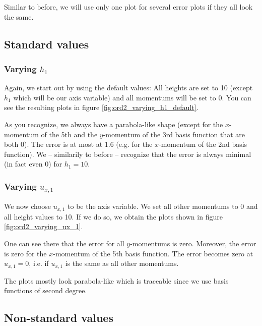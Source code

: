 \documentclass{article}
\begin{document}
Similar to before, we will use only one plot for several error plots if they all look the same.

\subsection{Standard values}
\label{sec:stiffness-analyiss-ord2-default}

\subsubsection{Varying $h_1$}
\label{sec:stiffness-analysis-ord2-default-var-h1}

Again, we start out by using the default values: All heights are set to 10 (except $h_1$ which will be our axis variable) and all momentums will be set to 0. You can see the resulting plots in figure \ref{fig:ord2_varying_h1_default}. 



As you recognize, we always have a parabola-like shape (except for the $x$-momentum of the 5th and the $y$-momentum of the 3rd basis function that are both 0). The error is at most at 1.6 (e.g. for the $x$-momentum of the 2nd basis function). We -- similarily to before -- recognize that the error is always minimal (in fact even 0) for $h_1=10$.

\subsubsection{Varying $u_{x,1}$}
\label{sec:stiffness-analysis-ord2-default-var-ux1}

We now choose $u_{x,1}$ to be the axis variable. We set all other momentums to 0 and all height values to 10. If we do so, we obtain the plots shown in figure \ref{fig:ord2_varying_ux_1}.



One can see there that the error for all $y$-momentums is zero. Moreover, the error is zero for the $x$-momentum of the 5th basis function. The error becomes zero at $u_{x,1}=0$, i.e. if $u_{x,1}$ is the same as all other momentums.

The plots mostly look parabola-like which is traceable since we use basis functions of second degree.

\subsection{Non-standard values}
\label{sec:stiffness-analysis-ord2-nondefault}
\end{document}
